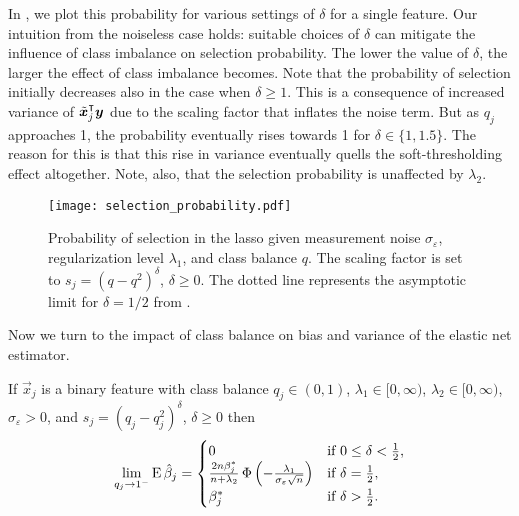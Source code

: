 In , we plot this probability for various settings of
\(\delta\) for a single feature. Our intuition from the noiseless case holds: suitable
choices of \(\delta\) can mitigate the influence of class imbalance on selection
probability. The lower the value of \(\delta\), the larger the effect of class imbalance
becomes. Note that the probability of selection initially decreases also in the case when
\(\delta \geq 1\). This is a consequence of increased variance of \(\tilde{\boldsymbol{x}}_j^\intercal
\boldsymbol{y}\) due to the scaling factor that inflates the noise term. But as \(q_j\) approaches
1, the probability eventually rises towards 1 for \(\delta \in \{1, 1.5\}\). The reason for
this is that this rise in variance eventually quells the soft-thresholding effect
altogether. Note, also, that the selection probability is unaffected by \(\lambda_2\).

\begin{figure}[htpb]
  \centering
  \texttt{[image: selection\_probability.pdf]}
  \caption{%
    Probability of selection in the lasso given measurement noise
    \(\sigma_\varepsilon\), regularization level \(\lambda_1\), and class
    balance \(q\). The scaling factor is set to \(s_j = (q - q^2)^\delta\),
    \(\delta \geq 0\). The dotted line represents the asymptotic limit for
    \(\delta = 1/2\) from .
    \label{fig:selection-probability}}
\end{figure}


Now we turn to the impact of class balance on bias and variance of the elastic net
estimator.

\begin{theorem}
  \label{thm:classbalance-bias}
  If \(\vec{x}_j\) is a binary feature with class balance \(q_j \in (0, 1)\),
  \(\lambda_1 \in [0,\infty)\), \(\lambda_2 \in [0,\infty)\),
  \(\sigma_\varepsilon > 0\), and \(s_j = (q_j - q_j^2)^{\delta}\), \(\delta
  \geq 0\)  then
  \[
    \lim_{q_j \rightarrow 1^-} \operatorname{E} \hat{\beta}_j =
    \begin{cases}
      0                                                                                                  & \text{if } 0 \leq \delta < \frac{1}{2}, \\
      \frac{2n \beta_j^*}{n + \lambda_2} \operatorname{\Phi}\left(-\frac{\lambda_1}{\sigma_\varepsilon \sqrt{n}}\right) & \text{if } \delta = \frac{1}{2},        \\
      \beta^*_j                                                                                          & \text{if } \delta > \frac{1}{2}.
    \end{cases}
  \]
\end{theorem}

